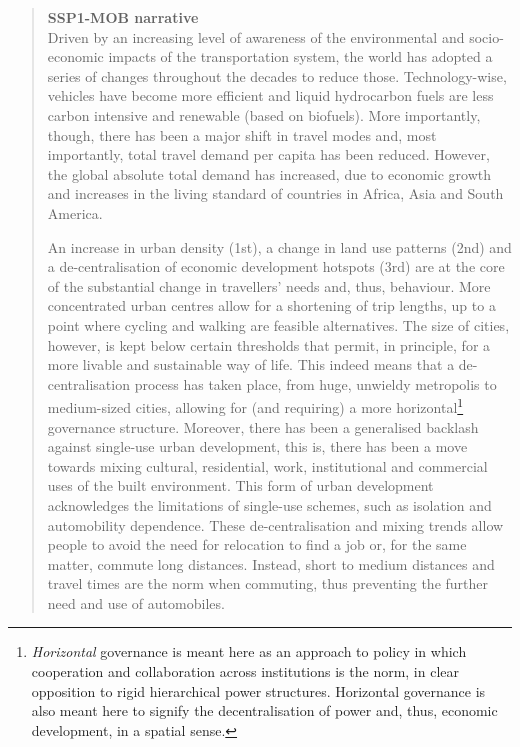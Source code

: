 \blockquote{\sffamily \textbf{SSP1-MOB narrative}\\Driven by an increasing level of awareness of the environmental and socio-economic impacts of the transportation system, the world has adopted a series of changes throughout the decades to reduce those. Technology-wise, vehicles have become more efficient and liquid hydrocarbon fuels are less carbon intensive and renewable (based on biofuels). More importantly, though, there has been a major shift in travel modes and, most importantly, total travel demand per capita has been reduced. However, the global absolute total demand has increased, due to economic growth and increases in the living standard of countries in Africa, Asia and South America.

An increase in urban density (1st), a change in land use patterns (2nd) and a de-centralisation of economic development hotspots (3rd) are at the core of the substantial change in travellers' needs and, thus, behaviour. More concentrated urban centres allow for a shortening of trip lengths, up to a point where cycling and walking are feasible alternatives. The size of cities, however, is kept below certain thresholds that permit, in principle, for a more livable and sustainable way of life. This indeed means that a de-centralisation process has taken place, from huge, unwieldy metropolis to medium-sized cities, allowing for (and requiring) a more horizontal\footnote{\emph{Horizontal} governance is meant here as an approach to policy in which cooperation and collaboration across institutions is the norm, in clear opposition to rigid hierarchical power structures. Horizontal governance is also meant here to signify the decentralisation of power and, thus, economic development, in a spatial sense.} governance structure. Moreover, there has been a generalised backlash against single-use urban development, this is, there has been a move towards mixing cultural, residential, work, institutional and commercial uses of the built environment. This form of urban development acknowledges the limitations of single-use schemes, such as isolation and automobility dependence. These de-centralisation and mixing trends allow people to avoid the need for relocation to find a job or, for the same matter, commute long distances. Instead, short to medium distances and travel times are the norm when commuting, thus preventing the further need and use of automobiles.

}
